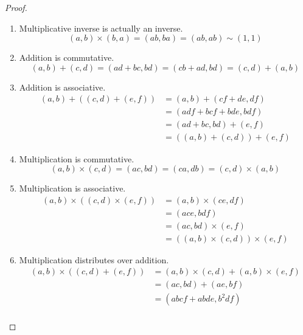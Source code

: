 \begin{proof}
\begin{enumerate}
\begin{equation}
        (a, b) + (-a, b) = (ab + (-ba), bb) = (0, bb) \sim (0, 1)
      \end{equation}
      \item Multiplicative inverse is actually an inverse. 
      \begin{equation}
        (a, b) \times (b, a) = (ab, ba) = (ab, ab) \sim (1, 1)
      \end{equation}
      \item Addition is commutative. 
      \begin{equation}
        (a, b) + (c, d) = (ad + bc, bd) = (cb + ad, bd) = (c, d) + (a, b)
      \end{equation}
      \item Addition is associative. 
      \begin{align}
        (a, b) + ((c, d) + (e, f)) & = (a, b) + (cf + de, df) \\
                                   & = (adf + bcf + bde, bdf) \\
                                   & = (ad + bc, bd) + (e, f) \\
                                   & = ((a, b) + (c, d)) + (e, f)
      \end{align}
      \item Multiplication is commutative. 
      \begin{equation}
        (a, b) \times (c, d) = (ac, bd) = (ca, db) = (c, d) \times (a, b)
      \end{equation}
      \item Multiplication is associative. 
      \begin{align}
        (a, b) \times ((c, d) \times (e, f)) & = (a, b) \times (ce, df) \\ 
                                             & = (ace, bdf) \\
                                             & = (ac, bd) \times (e, f) \\
                                             & = ((a, b) \times (c, d)) \times (e, f)
      \end{align}
      \item Multiplication distributes over addition. 
        \begin{align}
          (a, b) \times ((c, d) + (e, f)) & = (a, b) \times (c, d) + (a, b) \times (e, f) \\
                                          & = (ac, bd) + (ae, bf) \\
                                          & = (abcf + abde, b^2 df) \\

\end{align}
\end{enumerate}
\end{proof}
